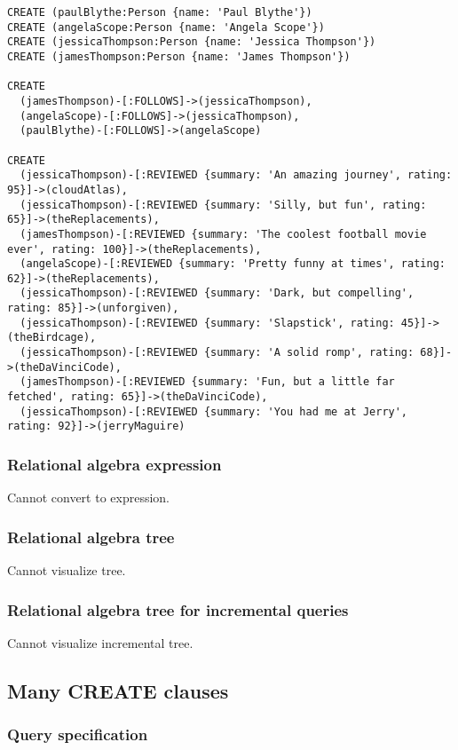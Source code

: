 \begin{lstlisting}
CREATE (paulBlythe:Person {name: 'Paul Blythe'})
CREATE (angelaScope:Person {name: 'Angela Scope'})
CREATE (jessicaThompson:Person {name: 'Jessica Thompson'})
CREATE (jamesThompson:Person {name: 'James Thompson'})

CREATE
  (jamesThompson)-[:FOLLOWS]->(jessicaThompson),
  (angelaScope)-[:FOLLOWS]->(jessicaThompson),
  (paulBlythe)-[:FOLLOWS]->(angelaScope)

CREATE
  (jessicaThompson)-[:REVIEWED {summary: 'An amazing journey', rating: 95}]->(cloudAtlas),
  (jessicaThompson)-[:REVIEWED {summary: 'Silly, but fun', rating: 65}]->(theReplacements),
  (jamesThompson)-[:REVIEWED {summary: 'The coolest football movie ever', rating: 100}]->(theReplacements),
  (angelaScope)-[:REVIEWED {summary: 'Pretty funny at times', rating: 62}]->(theReplacements),
  (jessicaThompson)-[:REVIEWED {summary: 'Dark, but compelling', rating: 85}]->(unforgiven),
  (jessicaThompson)-[:REVIEWED {summary: 'Slapstick', rating: 45}]->(theBirdcage),
  (jessicaThompson)-[:REVIEWED {summary: 'A solid romp', rating: 68}]->(theDaVinciCode),
  (jamesThompson)-[:REVIEWED {summary: 'Fun, but a little far fetched', rating: 65}]->(theDaVinciCode),
  (jessicaThompson)-[:REVIEWED {summary: 'You had me at Jerry', rating: 92}]->(jerryMaguire)
\end{lstlisting}

\subsubsection*{Relational algebra expression}

Cannot convert to expression.

\subsubsection*{Relational algebra tree}

Cannot visualize tree.

\subsubsection*{Relational algebra tree for incremental queries}

Cannot visualize incremental tree.

\subsection{Many CREATE clauses}

\subsubsection*{Query specification}


